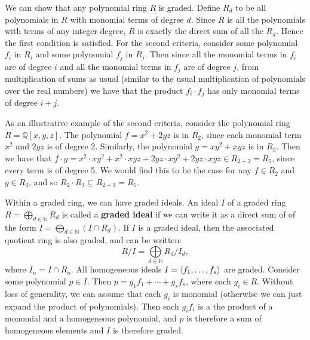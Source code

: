 We can show that any polynomial ring $R$ is graded. Define $R_d$ to be all polynomials in $R$ with monomial terms of degree $d$. Since $R$ is all the polynomials with terms of any integer degree, $R$ is exactly the direct sum of all the $R_d$. Hence the first condition is satisfied. For the second criteria, consider some polynomial $f_i$ in $R_i$ and some polynomial $f_j$ in $R_j$. Then since all the monomial terms in $f_i$ are of degree $i$ and all the monomial terms in $f_j$ are of degree $j$, from multiplication of sums as usual (similar to the usual multiplication of polynomials over the real numbers) we have that the product $f_i \cdot f_j$ has only monomial terms of degree $i + j$. 

As an illustrative example of the second criteria, consider the polynomial ring $R = \mathbb{Q}[x, y, z]$. The polynomial $f = x^2 + 2yz$ is in $R_2$, since each monomial term $x^2$ and $2yz$ is of degree 2. Similarly, the polynomial $g = xy^2 + xyz$ is in $R_3$. Then we have that $f \cdot g = x^2 \cdot xy^2 + x^2 \cdot xyz + 2yz \cdot xy^2 + 2yz \cdot xyz \in R_{2+3} = R_5$, since every term is of degree 5. We would find this to be the case for any $f \in R_2$ and $g \in R_3$, and so $R_2 \cdot R_3 \subseteq R_{2+3} = R_5$.

Within a graded ring, we can have graded ideals. An ideal $I$ of a graded ring $R= \bigoplus  \limits_{d \in \mathbb{N}} R_d$ is called a \textbf{graded ideal} if we can write it as a direct sum of of the form $I = \bigoplus \limits_{d \in \mathbb{N}} (I \cap R_d)$. If $I$ is a graded ideal, then the associated quotient ring is also graded, and can be written:
$$
R/I = \bigoplus \limits_{d \in \mathbb{N}} R_d / I_d,
$$
where $I_n = I \cap R_n$. All homogeneous ideals $I = \langle f_1, \dots, f_s \rangle$ are graded. Consider some polynomial $p \in I$. Then $p = g_1 f_1 + \cdots + g_s f_s$, where each $g_i \in R$. Without loss of generality, we can assume that each $g_i$ is monomial (otherwise we can just expand the product of polynomials). Then each $g_i f_i$ is a the product of a monomial and a homogeneous polynomial, and $p$ is therefore a sum of homogeneous elements and $I$ is therefore graded.

